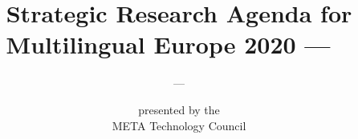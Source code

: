 %
%
%
% 

\usepackage{polyglossia}

\title{Strategic Research Agenda for Multilingual Europe 2020 --- ~}


\subtitle{~ --- ~}

\author{
  {\footnotesize presented by the}\\
  META Technology Council
}


\editors{
}

\SpineLText{%
}

\SpineRText{%
}

